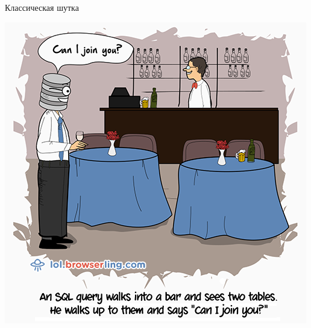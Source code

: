 \begin{frame}{Классическая шутка}
	\begin{center}
		\includegraphics[scale=0.4]{join-two-tables.png}
	\end{center}
\end{frame}
